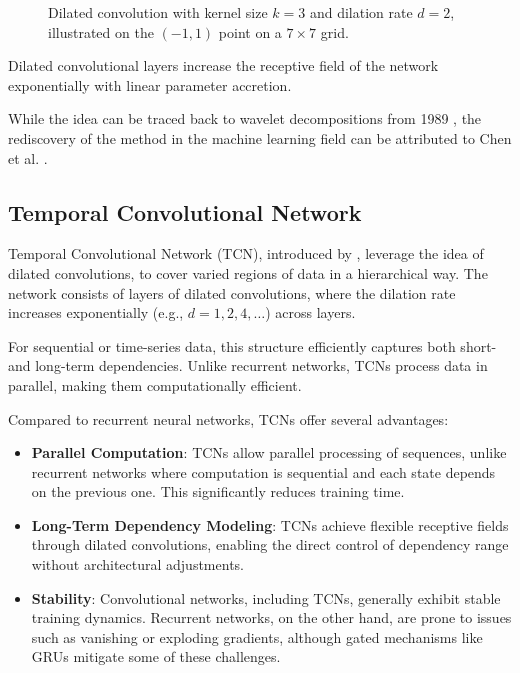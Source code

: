 \begin{figure}[ht!]
\centering

\caption[Dilated convolution.]{Dilated convolution with kernel size $k = 3$ and dilation rate $d = 2$, illustrated on the $(-1, 1)$ point on a $7 \times 7$ grid.}
\end{figure}

Dilated convolutional layers increase the receptive field of the network exponentially with linear parameter accretion. 

While the idea can be traced back to wavelet decompositions from 1989 \cite{Holschneider1989}, the rediscovery of the method in the machine learning field can be attributed to Chen et al. \cite{Chen2015}.

\subsection{Temporal Convolutional Network}

Temporal Convolutional Network (TCN), introduced by \cite{Colin2016}, leverage the idea of dilated convolutions, to cover varied regions of data in a hierarchical way. The network consists of layers of dilated convolutions, where the dilation rate increases exponentially (e.g., $d = 1, 2, 4, \dots$) across layers.

For sequential or time-series data, this structure efficiently captures both short- and long-term dependencies. Unlike recurrent networks, TCNs process data in parallel, making them computationally efficient.

Compared to recurrent neural networks, TCNs offer several advantages:
\begin{itemize}
	\item \textbf{Parallel Computation}: TCNs allow parallel processing of sequences, unlike recurrent networks where computation is sequential and each state depends on the previous one. This significantly reduces training time.
	\item \textbf{Long-Term Dependency Modeling}: TCNs achieve flexible receptive fields through dilated convolutions, enabling the direct control of dependency range without architectural adjustments.
	\item \textbf{Stability}: Convolutional networks, including TCNs, generally exhibit stable training dynamics. Recurrent networks, on the other hand, are prone to issues such as vanishing or exploding gradients, although gated mechanisms like GRUs mitigate some of these challenges. \end{itemize}

